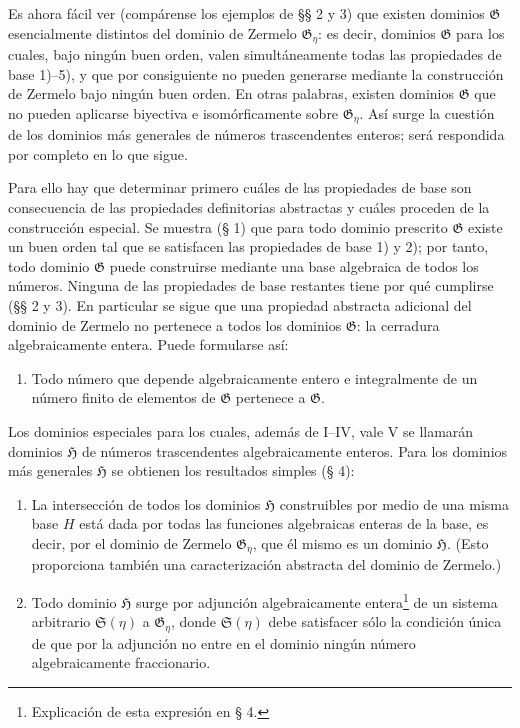 \documentclass[11pt]{article}
\begin{document}
Es ahora fácil ver (compárense los ejemplos de §§ 2 y 3) que existen dominios $\mathfrak G$ esencialmente distintos del dominio de Zermelo $\mathfrak G_\eta$: es decir, dominios $\mathfrak G$ para los cuales, bajo ningún buen orden, valen simultáneamente todas las propiedades de base 1)--5), y que por consiguiente no pueden generarse mediante la construcción de Zermelo bajo ningún buen orden. En otras palabras, existen dominios $\mathfrak G$ que no pueden aplicarse biyectiva e isomórficamente sobre $\mathfrak G_\eta$. Así surge la cuestión de los dominios más generales de números trascendentes enteros; será respondida por completo en lo que sigue.

Para ello hay que determinar primero cuáles de las propiedades de base son consecuencia de las propiedades definitorias abstractas y cuáles proceden de la construcción especial. Se muestra (§ 1) que para todo dominio prescrito $\mathfrak G$ existe un buen orden tal que se satisfacen las propiedades de base 1) y 2); por tanto, todo dominio $\mathfrak G$ puede construirse mediante una base algebraica de todos los números. Ninguna de las propiedades de base restantes tiene por qué cumplirse (§§ 2 y 3). En particular se sigue que una propiedad abstracta adicional del dominio de Zermelo no pertenece a todos los dominios $\mathfrak G$: la cerradura algebraicamente entera. Puede formularse así:
\begin{enumerate}
\item[V.] Todo número que depende algebraicamente entero e integralmente de un número finito de elementos de $\mathfrak G$ pertenece a $\mathfrak G$.
\end{enumerate}

Los dominios especiales para los cuales, además de I--IV, vale V se llamarán dominios $\mathfrak H$ de números trascendentes algebraicamente enteros. Para los dominios más generales $\mathfrak H$ se obtienen los resultados simples (§ 4):
\begin{enumerate}
\item[a)] La intersección de todos los dominios $\mathfrak H$ construibles por medio de una misma base $H$ está dada por todas las funciones algebraicas enteras de la base, es decir, por el dominio de Zermelo $\mathfrak G_\eta$, que él mismo es un dominio $\mathfrak H$. (Esto proporciona también una caracterización abstracta del dominio de Zermelo.)
\item[b)] Todo dominio $\mathfrak H$ surge por adjunción algebraicamente entera\footnote{Explicación de esta expresión en § 4.} de un sistema arbitrario $\mathfrak S(\eta)$ a $\mathfrak G_\eta$, donde $\mathfrak S(\eta)$ debe satisfacer sólo la condición única de que por la adjunción no entre en el dominio ningún número algebraicamente fraccionario.
\end{enumerate}
\end{document}
